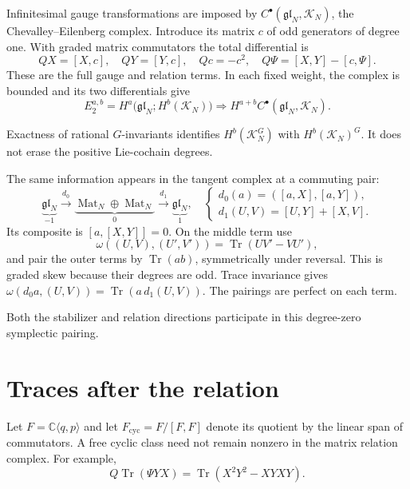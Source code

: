 Infinitesimal gauge transformations are imposed by
$C^\bullet(\mathfrak{gl}_N,\mathcal K_N)$, the
Chevalley--Eilenberg complex. Introduce its matrix $c$ of odd
generators of degree one. With graded matrix commutators the
total differential is
\begin{equation}\label{mht:eq:matrix-classical-brst}
 QX=[X,c],\quad QY=[Y,c],\quad Qc=-c^2,\quad
 Q\Psi=[X,Y]-[c,\Psi].
\end{equation}
These are the full gauge and relation terms. In each fixed
weight, the complex is bounded and its two differentials give
\[
 E_2^{a,b}
 =H^a\bigl(\mathfrak{gl}_N;H^b(\mathcal K_N)\bigr)
 \Longrightarrow
 H^{a+b}C^\bullet(\mathfrak{gl}_N,\mathcal K_N).
\]

Exactness of rational $G$-invariants identifies
$H^b(\mathcal K_N^G)$ with $H^b(\mathcal K_N)^G$.
It does not erase the positive Lie-cochain degrees.

The same information appears in the tangent complex at a
commuting pair:
\begin{equation}\label{mht:eq:matrix-tangent}
 \underbrace{\mathfrak{gl}_N}_{-1}
 \xrightarrow{\,d_0\,}
 \underbrace{\operatorname{Mat}_N\oplus\operatorname{Mat}_N}_{0}
 \xrightarrow{\,d_1\,}
 \underbrace{\mathfrak{gl}_N}_{1},
 \quad
 \begin{cases}
 d_0(a)=([a,X],[a,Y]),\\
 d_1(U,V)=[U,Y]+[X,V].
 \end{cases}
\end{equation}
Its composite is $[a,[X,Y]]=0$. On the middle term use
\[
 \omega((U,V),(U',V'))=\operatorname{Tr}(UV'-VU'),
\]
and pair the outer terms by $\operatorname{Tr}(ab)$,
symmetrically under reversal. This is graded skew because their
degrees are odd. Trace invariance gives
$\omega(d_0a,(U,V))=\operatorname{Tr}(a\,d_1(U,V))$.
The pairings are perfect on each term.

Both the stabilizer and relation directions participate in this
degree-zero symplectic pairing.

\section{Traces after the relation}

Let $F=\mathbb C\langle q,p\rangle$ and let
$F_{\mathrm{cyc}}=F/[F,F]$ denote its quotient by the linear
span of commutators. A free cyclic class need not remain nonzero
in the matrix relation complex. For example,
\begin{equation}\label{mht:eq:free-trace-boundary}
 Q\operatorname{Tr}(\Psi YX)
   =\operatorname{Tr}(X^2Y^2-XYXY).
\end{equation}

